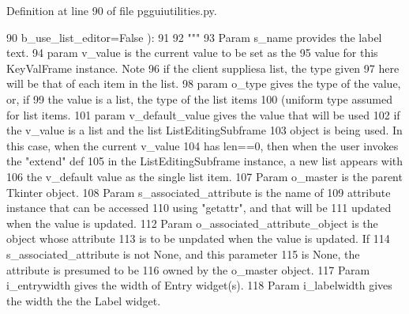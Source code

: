 Definition at line 90 of file pgguiutilities.\+py.


\begin{DoxyCode}
90                     b\_use\_list\_editor=\textcolor{keyword}{False} ):
91         
92         \textcolor{stringliteral}{"""}
93 \textcolor{stringliteral}{        Param s\_name provides the label text.}
94 \textcolor{stringliteral}{        param v\_value is the current value to be set as the}
95 \textcolor{stringliteral}{                value for this KeyValFrame instance.  Note}
96 \textcolor{stringliteral}{                if the client suppliesa list, the type given}
97 \textcolor{stringliteral}{                here will be that of each item in the list.}
98 \textcolor{stringliteral}{        param o\_type gives the type of the value, or, if}
99 \textcolor{stringliteral}{                the value is a list, the type of the list items}
100 \textcolor{stringliteral}{                (uniform type assumed for list items.}
101 \textcolor{stringliteral}{        param v\_default\_value gives the value that will be used}
102 \textcolor{stringliteral}{                if the v\_value is a list and the list ListEditingSubframe}
103 \textcolor{stringliteral}{                object is being used.  In this case, when the current v\_value}
104 \textcolor{stringliteral}{                has len==0, then when the user invokes the "extend" def}
105 \textcolor{stringliteral}{                in the ListEditingSubframe instance, a new list appears with}
106 \textcolor{stringliteral}{                the v\_default value as the single list item.}
107 \textcolor{stringliteral}{        Param o\_master is the parent Tkinter object.}
108 \textcolor{stringliteral}{        Param s\_associated\_attribute is the name of }
109 \textcolor{stringliteral}{            attribute instance that can be accessed}
110 \textcolor{stringliteral}{            using "getattr", and that will be}
111 \textcolor{stringliteral}{            updated when the value is updated.}
112 \textcolor{stringliteral}{        Param o\_associated\_attribute\_object is the object whose attribute}
113 \textcolor{stringliteral}{            is to be unpdated when the value is updated.  If}
114 \textcolor{stringliteral}{            s\_associated\_attribute is not None, and this parameter}
115 \textcolor{stringliteral}{            is None, the attribute is presumed to be}
116 \textcolor{stringliteral}{            owned by the o\_master object.}
117 \textcolor{stringliteral}{        Param i\_entrywidth gives the width of Entry widget(s).}
118 \textcolor{stringliteral}{        Param i\_labelwidth gives the width the the Label widget.}

\end{DoxyCode}
